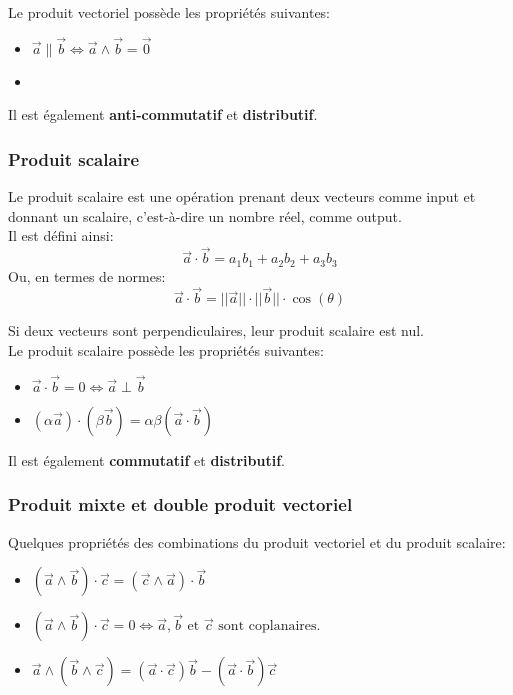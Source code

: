 \documentclass{article}
\numberwithin{equation}{section}
\begin{document}
Le produit vectoriel possède les propriétés suivantes:
\begin{itemize}
	\item \(\vec a \parallel \vec b \Leftrightarrow \vec a \wedge \vec b = \vec 0\)
	\item 
\end{itemize}
Il est également \textbf{anti-commutatif} et \textbf{distributif}.

\subsubsection{Produit scalaire}
Le produit scalaire est une opération prenant deux vecteurs comme input et donnant un scalaire, c'est-à-dire un nombre réel, comme output. \\
Il est défini ainsi:
\begin{equation}
	\boxed{ \vec a \cdot \vec b = a_1b_1 + a_2b_2 + a_3b_3 }
\end{equation}
Ou, en termes de normes:
\begin{equation}
	\boxed{ \vec a \cdot \vec b = ||\vec a|| \cdot ||\vec b|| \cdot \cos(\theta) }
\end{equation}

Si deux vecteurs sont perpendiculaires, leur produit scalaire est nul. \\

Le produit scalaire possède les propriétés suivantes:
\begin{itemize}
	\item \( \vec a \cdot \vec b = 0 \Leftrightarrow \vec a \perp \vec b \)
	\item \( (\alpha \vec a) \cdot (\beta \vec b) = \alpha \beta (\vec a \cdot \vec b) \)
\end{itemize}

Il est également \textbf{commutatif} et \textbf{distributif}.

\subsubsection{Produit mixte et double produit vectoriel}
Quelques propriétés des combinations du produit vectoriel et du produit scalaire:
\begin{itemize}
	\item \((\vec a \wedge \vec b) \cdot \vec c = (\vec c \wedge \vec a) \cdot \vec b\)
	\item \((\vec a \wedge \vec b) \cdot \vec c = 0 \Leftrightarrow \vec a, \vec b \text{ et } \vec c \text{ sont coplanaires.}\)
	\item \(\vec a \wedge (\vec b \wedge \vec c) = (\vec a \cdot \vec c) \vec b - (\vec a \cdot \vec b) \vec c\)
\end{itemize}
\end{document}
